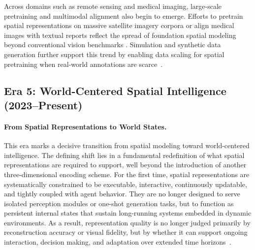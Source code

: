 Across domains such as remote sensing and medical imaging, large-scale pretraining and multimodal alignment also begin to emerge.
Efforts to pretrain spatial representations on massive satellite imagery corpora or align medical images with textual reports reflect the spread of foundation spatial modeling beyond conventional vision benchmarks \cite{cong2022satmae,sun2022ringmo}.
Simulation and synthetic data generation further support this trend by enabling data scaling for spatial pretraining when real-world annotations are scarce~\cite{Cabon2020VirtualKITTI2,pfaff2025scalable,xu2025stable}.











\subsection{Era 5: World-Centered Spatial Intelligence (2023--Present)}
\label{subsec:era-world-centered}





\paragraph{From Spatial Representations to World States.}
This era marks a decisive transition from spatial modeling toward world-centered intelligence.
The defining shift lies in a fundamental redefinition of what spatial representations are required to support, well beyond the introduction of another three-dimensional encoding scheme.
For the first time, spatial representations are systematically constrained to be executable, interactive, continuously updatable, and tightly coupled with agent behavior.
They are no longer designed to serve isolated perception modules or one-shot generation tasks, but to function as persistent internal states that sustain long-running systems embedded in dynamic environments.
As a result, representation quality is no longer judged primarily by reconstruction accuracy or visual fidelity, but by whether it can support ongoing interaction, decision making, and adaptation over extended time horizons~\cite{ha2018world,Feifei2025spatial}.


